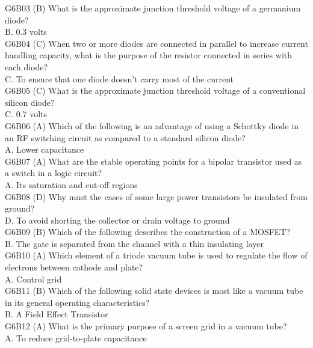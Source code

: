 \documentclass[12pt,letterpaper]{report}
\begin{document}
G6B03 (B) What is the approximate junction threshold voltage of a germanium diode?\\
B. 0.3 volts\\

G6B04 (C) When two or more diodes are connected in parallel to increase current handling capacity, what is the purpose of the resistor connected in series with each diode?\\
C. To ensure that one diode doesn't carry most of the current\\

G6B05 (C) What is the approximate junction threshold voltage of a conventional silicon diode?\\
C. 0.7 volts\\

G6B06 (A) Which of the following is an advantage of using a Schottky diode in an RF switching circuit as compared to a standard silicon diode?\\
A. Lower capacitance\\

G6B07 (A) What are the stable operating points for a bipolar transistor used as a switch in a logic circuit?\\
A. Its saturation and cut-off regions\\

G6B08 (D) Why must the cases of some large power transistors be insulated from ground?\\
D. To avoid shorting the collector or drain voltage to ground\\

G6B09 (B) Which of the following describes the construction of a MOSFET?\\
B. The gate is separated from the channel with a thin insulating layer\\

G6B10 (A) Which element of a triode vacuum tube is used to regulate the flow of electrons between cathode and plate?\\
A. Control grid\\

G6B11 (B) Which of the following solid state devices is most like a vacuum tube in its general operating characteristics?\\
B. A Field Effect Transistor\\

G6B12 (A) What is the primary purpose of a screen grid in a vacuum tube?\\
A. To reduce grid-to-plate capacitance\\
\end{document}
